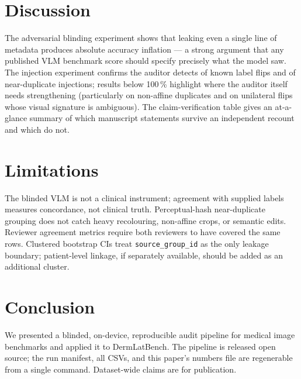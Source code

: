 \documentclass[conference]{IEEEtran}
\begin{document}


\section{Discussion}

The adversarial blinding experiment shows that leaking even a single line of
metadata produces \BlindingInflation{} absolute accuracy inflation — a strong
argument that any published VLM benchmark score should specify precisely what
the model saw. The injection experiment confirms the auditor detects
\InjLabelRecall{} of known label flips and \InjDupRecall{} of near-duplicate
injections; results below 100\,\% highlight where the auditor itself needs
strengthening (particularly on non-affine duplicates and on unilateral flips
whose visual signature is ambiguous). The claim-verification table gives an
at-a-glance summary of which manuscript statements survive an independent
recount and which do not.

\section{Limitations}

The blinded VLM is not a clinical instrument; agreement with supplied labels
measures concordance, not clinical truth. Perceptual-hash near-duplicate
grouping does not catch heavy recolouring, non-affine crops, or semantic
edits. Reviewer agreement metrics require both reviewers to have covered the
same rows. Clustered bootstrap CIs treat \verb|source_group_id| as the only
leakage boundary; patient-level linkage, if separately available, should be
added as an additional cluster.

\section{Conclusion}

We presented a blinded, on-device, reproducible audit pipeline for medical
image benchmarks and applied it to DermLatBench. The pipeline is released
open source; the run manifest, all CSVs, and this paper's numbers file are
regenerable from a single command. Dataset-wide claims are \ReadyOrNot{} for
publication.



\end{document}
